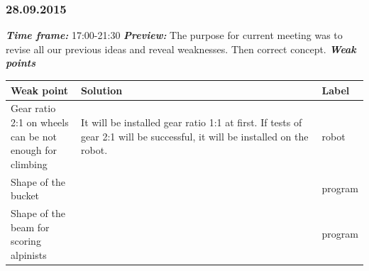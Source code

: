 \subsubsection{28.09.2015}
	\textit{\textbf{Time frame:}} 17:00-21:30 \newline
	\textit{\textbf{Preview:}} The purpose for current meeting was to revise all our previous ideas and reveal weaknesses. Then correct concept.\newline \newline
	\textit{\textbf{Weak points}}

  \begin{table}[H]
	\vspace{-2mm}
	\begin{center}
		\begin{tabular}{|p{0.2\linewidth}|p{0.7\linewidth}|p{0.1\linewidth}|}
			\hline
			Weak point & Solution & Label \\
			\hline
			Gear ratio 2:1 on wheels can be not enough for climbing & It will be installed gear ratio 1:1 at first. If tests of gear 2:1 will be successful, it will be installed on the robot. & robot \\
			\hline
			Shape of the bucket &  & program \\
			\hline
			Shape of the beam for scoring alpinists &  & program \\
			\hline
		\end{tabular}
	\end{center}
  \end{table}
  
